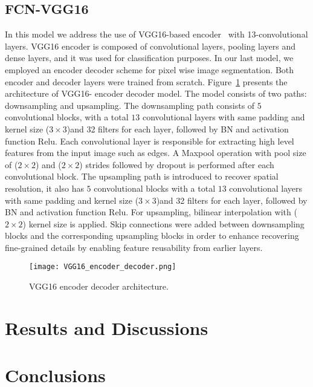 \documentclass[preprint,10pt]{elsarticle}
\begin{document}
\subsection{FCN-VGG16}
In this model we address the use of VGG16-based encoder~\cite{Simonyan2015} with 13-convolutional layers.
VGG16 encoder is composed of convolutional layers, pooling layers and dense layers, and it was used for classification purposes. 
In our last model, we employed an encoder decoder scheme for pixel wise image segmentation. 
Both encoder and decoder layers were trained from scratch.
Figure~\ref{vgg16} presents the architecture of VGG16- encoder decoder model. 
The model consists of two paths: downsampling and upsampling.
The downsampling path consists of \(5\) convolutional blocks,  with a total \(13\) convolutional layers  with same padding and kernel size (\(3\times3\))and 32 filters for each layer, followed by BN and activation function Relu.
Each convolutional layer is responsible for extracting high level features from the input image such as edges.
A Maxpool operation with pool size of (\(2\times2\))  and (\(2\times2\)) strides followed by dropout is performed after each convolutional block. 
The upsampling path is introduced to recover spatial resolution, it also has \(5\) convolutional blocks with a total \(13\) convolutional layers  with same padding and kernel size (\(3\times3\))and 32 filters for each layer, followed by BN and activation function Relu.
For upsampling, bilinear interpolation with (\(2\times2\)) kernel size is applied.
Skip connections were added between downsampling blocks and the corresponding upsampling blocks in order to enhance recovering fine-grained details by enabling feature reusability from earlier layers.
\begin{figure} [h!]
	\centering 
	\texttt{[image: VGG16\_encoder\_decoder.png]}
	\caption{VGG16 encoder decoder architecture.} 
	\label{vgg16}
\end{figure}


\section{Results and Discussions}

\section{Conclusions}
	



\section*{}

	
\section*{ }
{}

	
	
\end{document}
